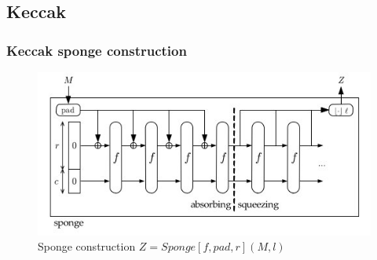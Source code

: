 \documentclass{beamer}
\begin{document}
\subsection{Keccak}

\begin{frame}
\frametitle{Keccak sponge construction}
\begin{figure}[h]
  \begin{center}
    \includegraphics[scale=0.5]{keccakspongeconstruction.jpg}
  \end{center}
  \caption{Sponge construction $Z = Sponge[f, pad, r](M, l)$\footnotemark}
  \label{fig:lab}
\end{figure}
\end{frame}
\end{document}
